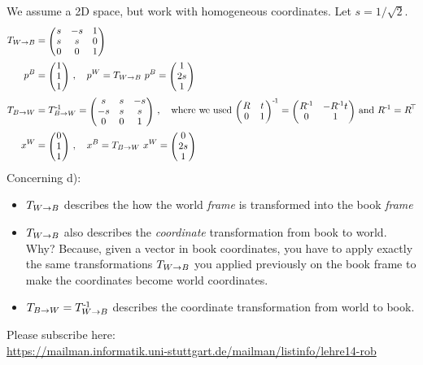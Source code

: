 \begin{solution}
We assume a 2D space, but work with homogeneous coordinates. Let $s= 1/\sqrt{2}$.
\begin{align}
\TR{W}{B}
&= \mat{ccc}{s & -s & 1 \\s & s & 0\\0&0&1} \\
p^B
&= \mat{c}{1 \\ 1 \\ 1} \comma
p^W
 = \TR{W}{B}~ p^B = \mat{c}{1 \\ 2s \\ 1} \\
\TR{B}{W}
&= \TR{B}{W}^\1
 = \mat{ccc}{s & s & -s \\-s & s & s\\0&0&1}\comma
\text{where we used}~
\mat{cc}{R & t\\0 & 1}^\1
= \mat{cc}{R^\1 & -R^\1 t\\0 & 1} ~\text{and}~ R^\1=R^\T \\
x^W
&= \mat{c}{0 \\ 1 \\ 1} \comma
x^B
 = \TR{B}{W}~ x^W
 = \mat{c}{0 \\ 2s \\ 1}
\end{align}
Concerning d):
\begin{itemize}
\item $T_{{W}\to{B}}$ describes the how the world \emph{frame} is transformed into the book \emph{frame}
\item $T_{{W}\to{B}}$ also describes the \emph{coordinate} transformation from book to world. Why? Because, given a vector in book coordinates, you have to apply exactly the same transformations $T_{{W}\to{B}}$ you applied previously on the book frame to make the coordinates become world coordinates.
\item $T_{{B}\to{W}} = T_{{W}\to{B}}^{{\hspace*{-.0pt}\text{\rm -}\hspace*{-.5pt}}1}$ describes the coordinate transformation from world to book.
\end{itemize}
\end{solution}



Please subscribe here:\\
{\small\url{https://mailman.informatik.uni-stuttgart.de/mailman/listinfo/lehre14-rob}}


